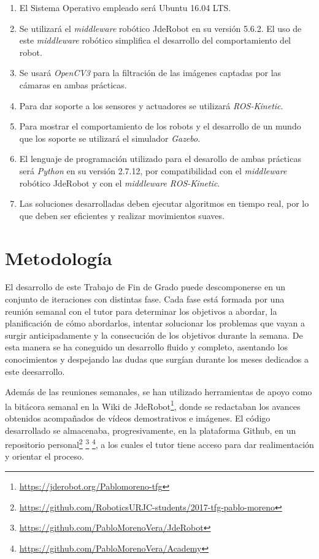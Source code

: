 \begin{enumerate}
	\item El Sistema Operativo empleado será Ubuntu 16.04 LTS.
	\item Se utilizará el \textit{middleware} robótico JdeRobot en su versión 5.6.2. El uso de este \textit{middleware} robótico simplifica el desarrollo del comportamiento del robot.
	\item Se usará \textit{OpenCV3} para la filtración de las imágenes captadas por las cámaras en ambas prácticas.
	\item Para dar soporte a los sensores y actuadores se utilizará \textit{ROS-Kinetic}.
	\item Para mostrar el comportamiento de los robots y el desarrollo de un mundo que los soporte se utilizará el simulador \textit{Gazebo}.
	\item El lenguaje de programación utilizado para el desarollo de ambas prácticas será \textit{Python} en su versión 2.7.12, por compatibilidad con el \textit{middleware} robótico JdeRobot y con el \textit{middleware ROS-Kinetic}.
	\item Las soluciones desarrolladas deben ejecutar algoritmos en tiempo real, por lo que deben ser eficientes y realizar movimientos suaves.
\end{enumerate}

\section{Metodología}
El desarrollo de este Trabajo de Fin de Grado puede descomponerse en un conjunto de iteraciones con distintas fase. Cada fase está formada por una reunión semanal con el tutor para determinar los objetivos a abordar, la planificación de cómo abordarlos, intentar solucionar los problemas que vayan a surgir anticipadamente y la consecución de los objetivos durante la semana. De esta manera se ha coneguido un desarrollo fluido y completo, asentando los conocimientos y despejando las dudas que surgían durante los meses dedicados a este deesarrollo.

Además de las reuniones semanales, se han utilizado herramientas de apoyo como la bitácora semanal en la Wiki de JdeRobot\footnote{\url{https://jderobot.org/Pablomoreno-tfg}}, donde se redactaban los avances obtenidos acompañados de vídeos demostrativos e imágenes. El código desarrollado se almacenaba, progresivamente, en la plataforma Github, en un repositorio personal\footnote{\url{https://github.com/RoboticsURJC-students/2017-tfg-pablo-moreno}} \footnote{\url{https://github.com/PabloMorenoVera/JdeRobot}} \footnote{\url{https://github.com/PabloMorenoVera/Academy}}, a los cuales el tutor tiene acceso para dar realimentación y orientar el proceso.

